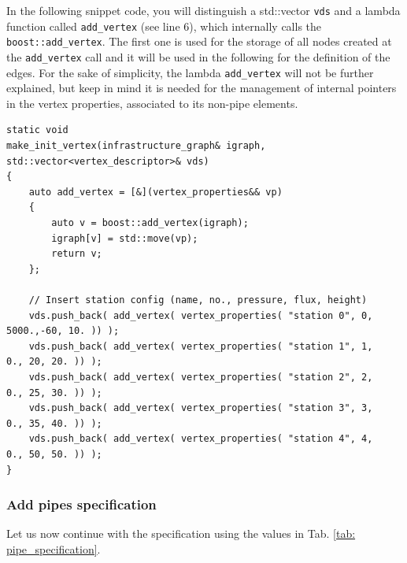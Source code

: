 In the following snippet code, you will distinguish a std::vector \texttt{vds} and a lambda function called \texttt{add\_vertex} (see line 6), which internally calls the \texttt{boost::add\_vertex}. The first one is used for the storage of all nodes created at the \texttt{add\_vertex} call  and it will be used in the following for the definition of the edges. For the sake of simplicity, the lambda \texttt{add\_vertex} will not be further explained, but keep in mind it  is needed for the management of internal pointers in the vertex properties, associated to its non-pipe elements. 

\begin{verbatim}
static void
make_init_vertex(infrastructure_graph& igraph, std::vector<vertex_descriptor>& vds)
{
    auto add_vertex = [&](vertex_properties&& vp) 
    {
        auto v = boost::add_vertex(igraph);
        igraph[v] = std::move(vp);
        return v;
    };

    // Insert station config (name, no., pressure, flux, height)
    vds.push_back( add_vertex( vertex_properties( "station 0", 0, 5000.,-60, 10. )) );
    vds.push_back( add_vertex( vertex_properties( "station 1", 1,    0., 20, 20. )) );
    vds.push_back( add_vertex( vertex_properties( "station 2", 2,    0., 25, 30. )) );
    vds.push_back( add_vertex( vertex_properties( "station 3", 3,    0., 35, 40. )) );
    vds.push_back( add_vertex( vertex_properties( "station 4", 4,    0., 50, 50. )) );
}
\end{verbatim}

\subsubsection{Add pipes specification}
Let us now continue with the  specification using the values in Tab. \ref{tab: pipe_specification}. 


